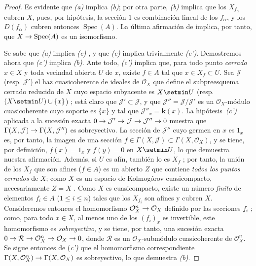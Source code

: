 \documentclass[oneside,10pt]{amsart}
\makeatletter
\renewcommand{\leq}{\leqslant}
\newcommand{\ega@arrow}[2]{\mathchoice{#1}{#2}{#2}{#2}}
\renewcommand{\to}{\ega@arrow{\longrightarrow}{\rightarrow}}
\newcommand{\oldpage}[2][]{\marginnote{\normalfont\footnotesize\textbf{#1}~|~#2}\ignorespaces}
\makeatother
\begin{document}
\begin{proof}
Es evidente que \emph{(a)} implica \emph{(b)};
por otra parte, \emph{(b)} implica que los $X_{f_\alpha}$ cubren $X$, pues, por hipótesis, la sección $1$ es combinación lineal de los $f_\alpha$, y los $D(f_\alpha)$ cubren entonces $\operatorname{Spec}(A)$.
La última afirmación de  implica, por tanto, que $X\to\operatorname{Spec}(A)$ es un isomorfismo.

Se sabe que \emph{(a)} implica \emph{(c)} , y que \emph{(c)} implica trivialmente \emph{(c')}.
Demostremos ahora que \emph{(c')} implica \emph{(b)}.
Ante todo, \emph{(c')} implica que, para todo punto \emph{cerrado} $x\in X$ y toda vecindad abierta $U$ de $x$, existe $f\in A$ tal que $x\in X_f\subset U$.
Sea $\mathcal{J}$ (resp. $\mathcal{J}'$) el haz cuasicoherente de ideales de $\mathcal{O}_X$ que define el subpreesquema cerrado reducido de $X$ cuyo espacio subyacente es $X\setmin U$ (resp. $(X\setmin U)\cup\{x\}$) ;
está claro que $\mathcal{J}'\subset\mathcal{J}$, y que $\mathcal{J}''=\mathcal{J}/\mathcal{J}'$ es un $\mathcal{O}_X$-módulo cuasicoherente cuyo soporte es $\{x\}$ y tal que $\mathcal{J}''_x=\boldsymbol{k}(x)$.
La hipótesis~\emph{(c')} aplicada a la sucesión exacta $0\to\mathcal{J}'\to\mathcal{J}\to\mathcal{J}''\to0$ muestra que $\Gamma(X,\mathcal{J})\to\Gamma(X,\mathcal{J}'')$ es sobreyectivo.
La sección de $\mathcal{J}''$ cuyo germen en $x$ es $1_x$ es, por tanto, la imagen de una sección $f\in\Gamma(X,\mathcal{J})\subset\Gamma(X,\mathcal{O}_X)$, y se tiene, por definición, $f(x)=1_x$ y $f(y)=0$ en $X\setmin U$, lo que demuestra nuestra afirmación.
Además, si $U$ es afín, también lo es $X_f$ ; por tanto, la unión de los $X_f$ que son afines ($f\in A$) es un abierto $Z$ que contiene \emph{todos los puntos cerrados} de $X$;
como $X$ es un espacio de Kolmogórov cuasicompacto, necesariamente $Z=X$ .
Como $X$ es cuasicompacto, existe un número \emph{finito} de elementos $f_i\in A$ ($1\leq i\leq n$) tales que los $X_{f_i}$ son afines y cubren $X$.
Consideremos entonces el homomorfismo $\mathcal{O}_X^n\to\mathcal{O}_X$ definido por las secciones $f_i$ ;
como, para todo $x\in X$, al menos uno de los $(f_i)_x$ es invertible, este homomorfismo es \emph{sobreyectivo}, y se tiene, por tanto, una sucesión exacta $0\to\mathcal{R}\to\mathcal{O}_X^n\to\mathcal{O}_X\to0$, donde $\mathcal{R}$ es un $\mathcal{O}_X$-submódulo cuasicoherente de $\mathcal{O}_X^n$.
Se sigue entonces
\oldpage[II]{98}
de (\emph{c')} que el homomorfismo correspondiente $\Gamma(X,\mathcal{O}_X^n)\to\Gamma(X,\mathcal{O}_X)$ es sobreyectivo, lo que demuestra \emph{(b)}.


\end{proof}
\end{document}
